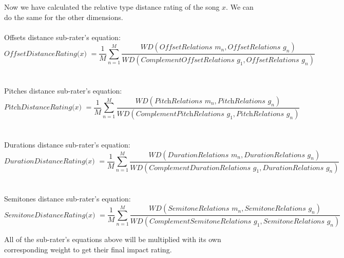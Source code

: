 Now we have calculated the relative type distance rating of the song $x$. We can do the same for the other dimensions.\\\\
Offsets distance sub-rater's equation:
\[ \textit{OffsetDistanceRating($x$) } =  \frac{1}{M}\sum_{n=1}^{M}
\frac{WD(\textit{OffsetRelations $m_n$},\textit{OffsetRelations $g_n$})} {WD(\textit{ComplementOffsetRelations $g_1$},\textit{OffsetRelations $g_n$})} \]
\\\\
Pitches distance sub-rater's equation:
\[ \textit{PitchDistanceRating($x$) } =  \frac{1}{M}\sum_{n=1}^{M}
\frac{WD(\textit{PitchRelations $m_n$},\textit{PitchRelations $g_n$})} {WD(\textit{ComplementPitchRelations $g_1$},\textit{PitchRelations $g_n$})} \]
\\\\
Durations distance sub-rater's equation:
\[ \textit{DurationDistanceRating($x$) } =  \frac{1}{M}\sum_{n=1}^{M}
\frac{WD(\textit{DurationRelations $m_n$},\textit{DurationRelations $g_n$})} {WD(\textit{ComplementDurationRelations $g_1$},\textit{DurationRelations $g_n$})} \]
\\\\
Semitones distance sub-rater's equation:
\[ \textit{SemitoneDistanceRating($x$) } =  \frac{1}{M}\sum_{n=1}^{M}
\frac{WD(\textit{SemitoneRelations $m_n$},\textit{SemitoneRelations $g_n$})} {WD(\textit{ComplementSemitoneRelations $g_1$},\textit{SemitoneRelations $g_n$})} \]

All of the sub-rater's equations above will be multiplied with its own corresponding weight to get their final impact rating.
